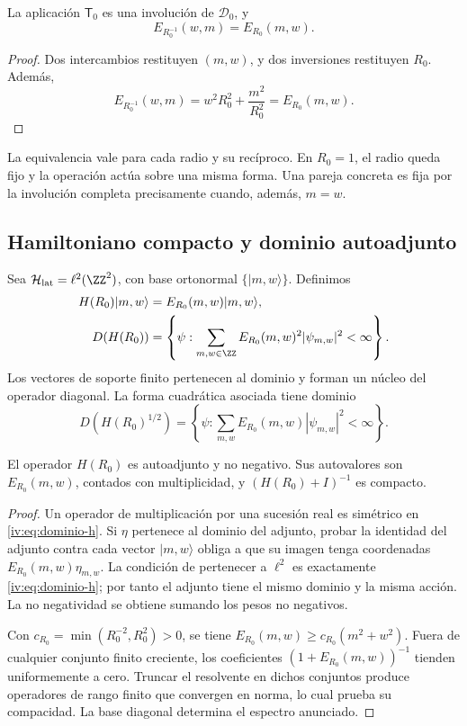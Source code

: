 \begin{theorem}
\label{iv:thm:dualidad-escalar}
La aplicación \(\mathsf T_0\) es una involución de
\(\mathscr D_0\), y
\[
 E_{R_0^{-1}}(w,m)=E_{R_0}(m,w).
\]
\end{theorem}
\begin{proof}
Dos intercambios restituyen \((m,w)\), y dos inversiones restituyen
\(R_0\). Además,
\[
 E_{R_0^{-1}}(w,m)=w^2R_0^2+\frac{m^2}{R_0^2}
 =E_{R_0}(m,w).
\]
\end{proof}

La equivalencia vale para cada radio y su recíproco. En \(R_0=1\),
el radio queda fijo y la operación actúa sobre una misma forma.
Una pareja concreta es fija por la involución completa precisamente
cuando, además, \(m=w\).

\subsection{Hamiltoniano compacto y dominio autoadjunto}

Sea \(\mathcal H_{\mathrm{lat}}=\ell^2(\ZZ^2)\), con base
ortonormal \(\{|m,w\rangle\}\). Definimos
\begin{align}
 H(R_0)|m,w\rangle&=E_{R_0}(m,w)|m,w\rangle,\label{iv:eq:hamiltoniano}\\
 D(H(R_0))&=\left\{\psi:\sum_{m,w\in\ZZ}
 E_{R_0}(m,w)^2|\psi_{m,w}|^2<\infty\right\}.\label{iv:eq:dominio-h}
\end{align}
Los vectores de soporte finito pertenecen al dominio y forman un
núcleo del operador diagonal. La forma cuadrática asociada tiene
dominio
\[
 D(H(R_0)^{1/2})=\left\{\psi:\sum_{m,w}
 E_{R_0}(m,w)|\psi_{m,w}|^2<\infty\right\}.
\]

\begin{proposition}
\label{iv:prop:h-autoadjunto}
El operador \(H(R_0)\) es autoadjunto y no negativo. Sus
autovalores son \(E_{R_0}(m,w)\), contados con multiplicidad,
y \((H(R_0)+I)^{-1}\) es compacto.
\end{proposition}
\begin{proof}
Un operador de multiplicación por una sucesión real es simétrico
en \eqref{iv:eq:dominio-h}. Si \(\eta\) pertenece al dominio
del adjunto, probar la identidad del adjunto contra cada vector
\(|m,w\rangle\) obliga a que su imagen tenga coordenadas
\(E_{R_0}(m,w)\eta_{m,w}\). La condición de pertenecer a
\(\ell^2\) es exactamente \eqref{iv:eq:dominio-h}; por tanto
el adjunto tiene el mismo dominio y la misma acción. La no
negatividad se obtiene sumando los pesos no negativos.

Con \(c_{R_0}=\min(R_0^{-2},R_0^2)>0\), se tiene
\(E_{R_0}(m,w)\geq c_{R_0}(m^2+w^2)\). Fuera de cualquier
conjunto finito creciente, los coeficientes
\((1+E_{R_0}(m,w))^{-1}\) tienden uniformemente a cero.
Truncar el resolvente en dichos conjuntos produce operadores
de rango finito que convergen en norma, lo cual prueba su
compacidad. La base diagonal determina el espectro anunciado.
\end{proof}

